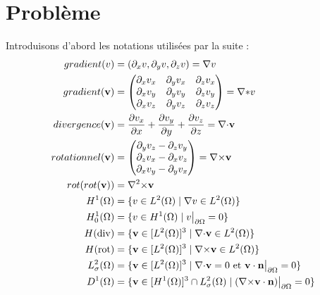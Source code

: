 \part{Problème}
\label{partProb}
Introduisons d'abord les notations utilisées par la suite :
\begin{align*}
gradient(v)&=(\partial_x v, \partial_y v, \partial_z v)={\nabla} v\\
gradient(\mathbf{v})&=\begin{pmatrix}
\partial_x v_x & \partial_y v_x & \partial_z v_x\\
\partial_x v_y & \partial_y v_y & \partial_z v_y\\
\partial_x v_z & \partial_y v_z & \partial_z v_z
\end{pmatrix}={\nabla}\mathbf*{v}\\
divergence(\mathbf{v})&=\frac{\partial v_x}{\partial x}+\frac{\partial v_y}{\partial y}+\frac{\partial v_z}{\partial z}={\nabla\cdot} \mathbf{v}\\
rotationnel(\mathbf{v})&=\begin{pmatrix}
\partial_y v_z - \partial_z v_y\\
\partial_z v_x - \partial_x v_z\\
\partial_x v_y - \partial_y v_x
\end{pmatrix}={\nabla\times} \mathbf{v}\\
rot(rot(\mathbf{v}))&={\nabla^2\times} \mathbf{v}\\
H^1(\Omega) &= \{v \in L^2(\Omega)\;|\; {\nabla} v\in L^2(\Omega)\}\\
H^1_0(\Omega) &= \{v \in H^1(\Omega)\; |\; v{\big\rvert_{\partial\Omega}} = 0\}\\
H(\mathrm{div}) &= \{\mathbf{v} \in [L^2(\Omega)]^3\; |\; {\nabla\cdot}\mathbf{v} \in L^2(\Omega) \}\\
H(\mathrm{rot}) &= \{\mathbf{v} \in [L^2(\Omega)]^3\; |\; {\nabla\times}\mathbf{v} \in L^2(\Omega) \}\\
L^2_\sigma(\Omega) &= \{\mathbf{v} \in [L^2(\Omega)]^3\; |\; {\nabla\cdot} \mathbf{v} = 0\text{ et }\mathbf{v}\cdot \mathbf{n}{\big\rvert_{\partial\Omega}} = 0 \}\\
D^1(\Omega) &= \{\mathbf{v} \in [H^1(\Omega)]^3\cap L^2_\sigma(\Omega)\; |\; ({\nabla\times} \mathbf{v}\cdot \mathbf{n}){\big\rvert_{\partial\Omega}} = 0  \}
\end{align*}

